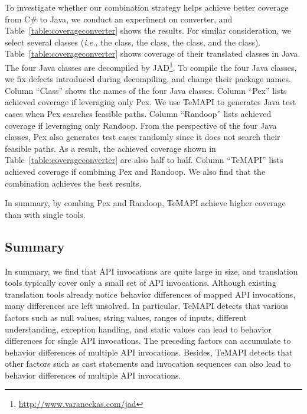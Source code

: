 To investigate whether our combination strategy helps achieve better coverage from C\# to Java, we conduct an experiment on converter, and Table~\ref{table:coverageconverter} shows the results.  For similar consideration, we select several classes (\emph{i.e.}, the  class, the  class, the  class, and the  class). Table~\ref{table:coverageconverter} shows coverage of their translated classes in Java. The four Java classes are decompiled by JAD\footnote{\url{http://www.varaneckas.com/jad}}. To compile the four Java classes, we fix defects introduced during decompiling, and change their package names. Column ``Class'' shows the names of the four Java classes. Column ``Pex'' lists achieved coverage if leveraging only Pex. We use TeMAPI to generates Java test cases when Pex searches feasible paths. Column ``Randoop'' lists  achieved coverage if leveraging only Randoop. From the perspective of the four Java classes, Pex also generates test cases randomly since it does not search their feasible paths. As a result, the achieved coverage shown in Table~\ref{table:coverageconverter} are also half to half. Column ``TeMAPI'' lists  achieved coverage if combining Pex and  Randoop. We also find that the combination achieves the best results.

In summary, by combing Pex and Randoop, TeMAPI achieve higher coverage than with single tools.
\subsection{Summary}
\label{sec:evaluation:summary}
In summary, we find that API invocations are quite large in size, and translation tools typically cover only a small set of API invocations. Although existing translation tools already notice behavior differences of mapped API invocations, many differences are left unsolved. In particular, TeMAPI detects that various factors such as null values, string values, ranges of inputs, different understanding, exception handling, and static values can lead to behavior differences for single API invocations. The preceding factors can accumulate to behavior differences of multiple API invocations. Besides, TeMAPI detects that other factors such as cast statements and invocation sequences can also lead to behavior differences of multiple API invocations.

